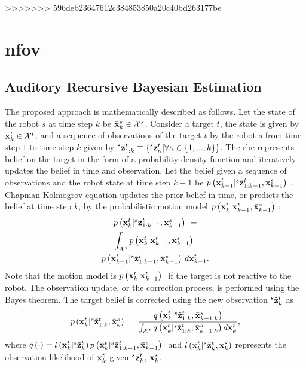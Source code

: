 \documentclass[letterpaper, 10 pt, conference]{ieeeconf}  %
\begin{document}
>>>>>>> 596deb23647612c384853850a20c40bd263177be
\section{\gls{nfov}}
\subsection{Auditory Recursive Bayesian Estimation}
The proposed approach is mathematically described as follows. Let the state of the robot $s$ at time step $k$ be $\bar {\mathbf{x}}_{k}^{s} \in \mathcal{X}^s$. Consider a target $t$, the state is given by $\mathbf{x}_{k}^{t} \in \mathcal{X}^t$, and a sequence of observations of the target $t$ by the robot $s$ from time step $1$ to time step $k$ given by ${}^{s}\tilde {\mathbf{z}}_{1:k}^{t} \equiv \left \{ {}^{s}\tilde {\mathbf{z}}_{\kappa}^{t}|\forall \kappa \in \left \{ 1,...,k \right \} \right \}$. The \gls{rbe} represents belief on the target in the form of a probability density function and iteratively updates the belief in time and observation.  Let the belief given a sequence of observations and the robot state at time step ${k-1}$ be  $\mbox{$ {p} \left ( \mathbf{x}_{k-1}^{t}|{}^{s}\tilde {\mathbf{z}}_{1:k-1}^{t},\bar {\mathbf{x}}_{k-1}^{s} \right )$ }$.  Chapman-Kolmogrov equation updates the prior belief in time, or predicts the belief at time step $k$, by the probabilistic motion model $\mbox{$ {p} \left ( \mathbf{x}_{k}^{t}|\mathbf{x}_{k-1}^{t},\bar {\mathbf{x}}_{k-1}^{s} \right )$ }$: 
\begin{multline}\label{eq:predictT}
\mbox{$ {p} \left ( \mathbf{x}_{k}^{t}|{}^{s}\tilde {\mathbf{z}}_{1:k-1}^{t},\bar {\mathbf{x}}_{k-1}^{s} \right )$ } =\\ \int_{\mathcal{X}^t} \mbox{$ {p} \left ( \mathbf{x}_{k}^{t}|\mathbf{x}_{k-1}^{t},\bar {\mathbf{x}}_{k-1}^{s} \right )$ } \\  \mbox{$ {p} \left ( \mathbf{x}_{k-1}^{t}|{}^{s}\tilde {\mathbf{z}}_{1:k-1}^{t},\bar {\mathbf{x}}_{k-1}^{s} \right )$ } d\mathbf{x}_{k-1}^{t}.
\end{multline}
Note that the motion model is $\mbox{$ {p} \left ( \mathbf{x}_{k}^{t}|\mathbf{x}_{k-1}^{t} \right )$ }$ if the target is not reactive to the robot.  The observation update, or the correction process, is performed using the Bayes theorem.  The target belief is corrected using the new observation ${}^{s}\tilde {\mathbf{z}}_{k}^{t}$ as
\begin{eqnarray}\label{eq:correctT}
\mbox{$ {p} \left ( \mathbf{x}_{k}^{t}|{}^{s}\tilde {\mathbf{z}}_{1:k}^{t},\bar {\mathbf{x}}_{k}^{s} \right )$ } =  \frac{q \left ( \mathbf{x}_{k}^{t}|{}^{s}\tilde {\mathbf{z}}_{1:k}^{t},\bar {\mathbf{x}}_{k-1:k}^{s} \right )} {\int_{\mathcal{X}^t}
	q \left ( \mathbf{x}_{k}^{t}|{}^{s}\tilde {\mathbf{z}}_{1:k}^{t},\bar {\mathbf{x}}_{k-1:k}^{s} \right ) d\mathbf{x}_{k}^{t}},
\end{eqnarray}
where $q \left ( \cdot \right ) = {l \left ( \mathbf{x}_{k}^{t}|{}^{s}\tilde {\mathbf{z}}_{k}^{t} \right ) \mbox{$ {p} \left ( \mathbf{x}_{k}^{t}|{}^{s}\tilde {\mathbf{z}}_{1:k-1}^{t},\bar {\mathbf{x}}_{k-1}^{s} \right )$ }}$ and $l \left ( \mathbf{x}_{k}^{t}|{}^{s}\tilde {\mathbf{z}}_{k}^{t},\bar {\mathbf{x}}_{k}^{s} \right )$ represents the observation likelihood of $\mathbf{x}_{k}^{t}$ given ${}^{s}\tilde {\mathbf{z}}_{k}^{t}$, $\bar {\mathbf{x}}_{k}^{s}$.  
\end{document}
